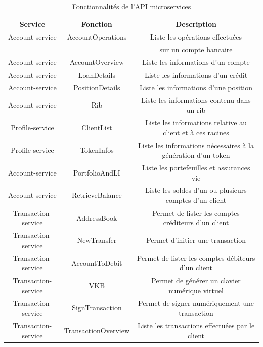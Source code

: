 
\begin{table}[h!]
	\center
	\begin{tabular}{| c | c | c |}
     \hline
     Service & Fonction & Description \\ \hline
     Account-service & AccountOperations & Liste les opérations effectuées \\ & & sur un compte bancaire \\ \hline
     Account-service & AccountOverview & Liste les informations d'un compte \\ \hline
     Account-service & LoanDetails & Liste les informations d'un crédit \\ \hline
     Account-service & PositionDetails & Liste les informations d'une position \\ \hline
     Account-service & Rib & Liste les informations contenu dans un rib \\ \hline
     Profile-service & ClientList & Liste les informations relative au client et à ces racines \\ \hline
     Profile-service & TokenInfos & Liste les informations nécessaires à la génération d'un token \\ \hline
     Account-service & PortfolioAndLI & Liste les portefeuilles et assurances vie \\ \hline
     Account-service & RetrieveBalance & Liste les soldes d'un ou plusieurs comptes d'un client \\ \hline
     Transaction-service & AddressBook & Permet de lister les comptes créditeurs d'un client \\ \hline
     Transaction-service & NewTransfer & Permet d'initier une transaction \\ \hline
     Transaction-service & AccountToDebit & Permet de lister les comptes débiteurs d'un client \\ \hline
     Transaction-service & VKB & Permet de générer un clavier numérique virtuel \\ \hline
     Transaction-service & SignTransaction & Permet de signer numériquement une transaction \\ \hline
     Transaction-service & TransactionOverview & Liste les transactions effectuées par le client\\
     \hline
	\end{tabular}
	\caption{Fonctionnalités de l'API microservices}
	\label{fonctionnalites}
\end{table}
